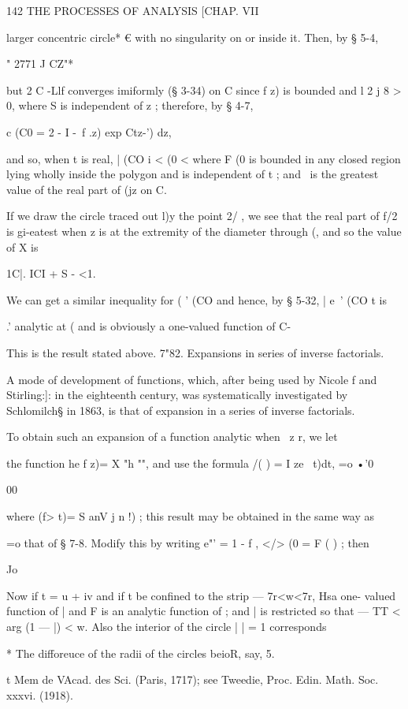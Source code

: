 {142 THE PROCESSES OF ANALYSIS [CHAP. VII

larger concentric circle* € with no singularity on or inside it. Then,
by § 5-4,

" 2771 J CZ"*

but 2 C -Llf converges imiformly (§ 3-34) on C since f z) is bounded
and l 2 j 8 > 0, where S is independent of z ; therefore, by § 4-7,

c (C0 = 2 - I -\ f .z) exp Ctz-') dz,

and so, when t is real, | (CO i < (0 < where F (0 is bounded in any
closed region lying wholly inside the polygon and is independent of t
; and \ is the greatest value of the real part of (jz on C.

If we draw the circle traced out l)y the point 2/ , we see that the
real part of f/2 is gi-eatest when z is at the extremity of the
diameter through (, and so the value of X is

1C|. ICI + S - <1.

We can get a similar inequality for ( ' (CO and hence, by § 5-32, |
e~' (CO t is

.' analytic at ( and is obviously a one-valued function of C-

This is the result stated above. 7"82. Expansions in series of inverse
factorials.

A mode of development of functions, which, after being used by Nicole
f and Stirling:]: in the eighteenth century, was systematically
investigated by Schlomilch§ in 1863, is that of expansion in a series
of inverse factorials.

To obtain such an expansion of a function analytic when \ z r, we let

the function he f z)= X "h "", and use the formula /( ) = I ze~ t)dt,
=o •'0

00

where (f> t)= S anV j n !) ; this result may be obtained in the same
way as

 =o that of § 7-8. Modify this by writing e"' = 1 - f , </> (0 = F ( )
; then

Jo

Now if t = u + iv and if t be confined to the strip — 7r<w<7r, Hsa
one- valued function of | and F is an analytic function of ; and | is
restricted so that — TT < arg (1 — |) < w. Also the interior of the
circle | | = 1 corresponds

* The difforeuce of the radii of the circles beioR, say, 5.

t Mem de VAcad. des Sci. (Paris, 1717); see Tweedie, Proc. Edin. Math.
Soc. xxxvi. (1918).

}
